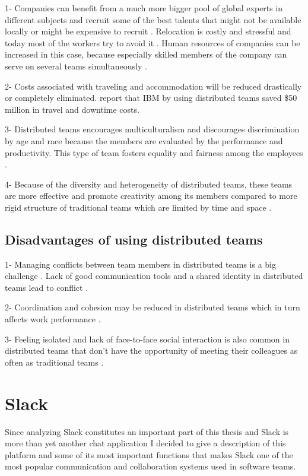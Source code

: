 1- Companies can benefit from a much more bigger pool of global experts in different subjects and recruit some of the best talents that might not be available locally or might be expensive to recruit \citep{Snyder2003}. Relocation is costly and stressful and today most of the workers try to avoid it \citep{Lipnack1997,Joinson2002}. Human resources of companies can be increased in this case, because especially skilled members of the company can serve on several teams simultaneously \citep{Hertel2004}. 

2- Costs associated with traveling and accommodation will be reduced drastically or completely eliminated. \citet{Baskerville2007} report that IBM by using distributed teams saved \$50 million in travel and downtime costs.

3- Distributed teams encourages multiculturalism and discourages discrimination by age and race because the members are evaluated by the performance and productivity. This type of team fosters equality and fairness among the employees \citep{Bergiel2007}.

4- Because of the diversity and heterogeneity of distributed teams, these teams are more effective and promote creativity among its members compared to more rigid structure of traditional teams which are limited by time and space \citep{Bergiel2008}.
\subsection{Disadvantages of using distributed teams}
1- Managing conflicts between team members in distributed teams is a big challenge \citep{Hinds2003}. Lack of good communication tools and a shared identity in distributed teams lead to conflict \citep{Hinds2005a}. 

2- Coordination and cohesion may be reduced in distributed teams which in turn affects work performance \citep{DeRosa2004}.

3- Feeling isolated and lack of face-to-face social interaction is also common in distributed teams that don't have the opportunity of meeting their colleagues as often as traditional teams \citep{Kiesler2002}.

\section{Slack} \label{slack}
Since analyzing Slack constitutes an important part of this thesis and Slack is more than yet another chat application I decided to give a description of this platform and some of its most important functions that makes Slack one of the most popular communication and collaboration systems used in software teams.

